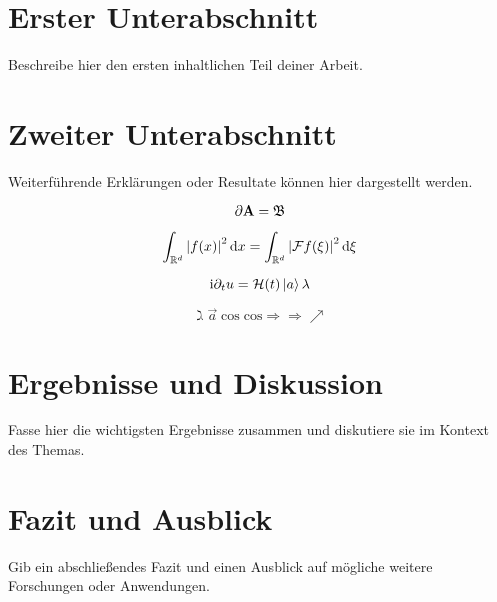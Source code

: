 \section{Erster Unterabschnitt}
Beschreibe hier den ersten inhaltlichen Teil deiner Arbeit.

\section{Zweiter Unterabschnitt}
Weiterführende Erklärungen oder Resultate können hier dargestellt werden.

\begin{equation*}
    \partial \mathbf{A} = \mathfrak{B}
\end{equation*}

\medskip

\begin{equation}
    \int_{\mathbb{R}^d} {\left\vert f(x)\right\vert}^2 \, \mathrm{d} x = \int_{\mathbb{R}^d} {\left\vert\mathcal{F} f(\xi)\right\vert}^2 \, \mathrm{d} \xi
\end{equation}

\medskip

\begin{equation}
    \mathrm{i} \partial_t u = \mathcal{H}(t) \Ket{a} \lambda 
\end{equation}

\begin{equation}
    \gimel \overrightarrow{a} \cos \mathrm{cos} \Rightarrow \Longrightarrow \nearrow 
\end{equation}

\section{Ergebnisse und Diskussion}
Fasse hier die wichtigsten Ergebnisse zusammen und diskutiere sie im Kontext des Themas.

\section{Fazit und Ausblick}
Gib ein abschließendes Fazit und einen Ausblick auf mögliche weitere Forschungen oder Anwendungen.
